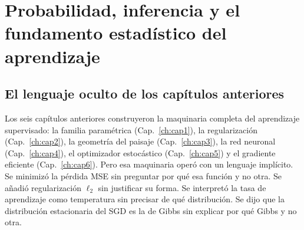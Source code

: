 
\chapter{Probabilidad, inferencia y el fundamento estadístico del aprendizaje}
\label{ch:cap7}

\section{El lenguaje oculto de los capítulos anteriores}
\label{sec:apertura7}


Los seis capítulos anteriores construyeron la maquinaria completa del
aprendizaje supervisado: la familia paramétrica (Cap.~\ref{ch:cap1}), la
regularización (Cap.~\ref{ch:cap2}), la geometría del paisaje
(Cap.~\ref{ch:cap3}), la red neuronal (Cap.~\ref{ch:cap4}), el
optimizador estocástico (Cap.~\ref{ch:cap5}) y el gradiente eficiente
(Cap.~\ref{ch:cap6}). Pero esa maquinaria operó con un lenguaje implícito.
Se minimizó la pérdida MSE sin preguntar por qué esa función y no otra. Se
añadió regularización $\ell_2$ sin justificar su forma. Se interpretó la
tasa de aprendizaje como temperatura sin precisar de qué distribución. Se
dijo que la distribución estacionaria del SGD es la de Gibbs sin explicar
por qué Gibbs y no otra.

